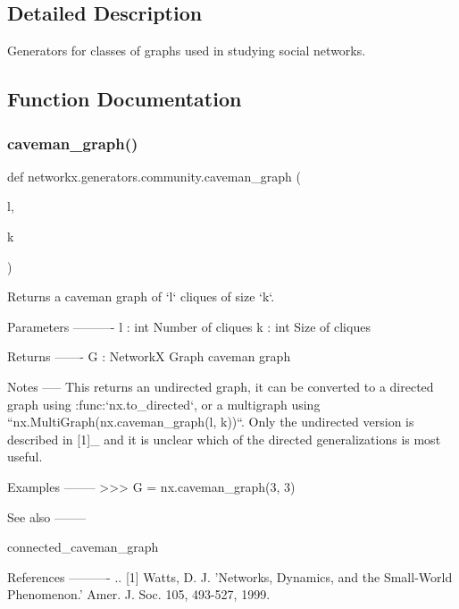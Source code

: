 \subsection{Detailed Description}
\begin{DoxyVerb}Generators for classes of graphs used in studying social networks.\end{DoxyVerb}
 

\subsection{Function Documentation}
\mbox{\label{namespacenetworkx_1_1generators_1_1community_a5a923d44ea3d13312625c65b2e0ff58f}} 
\subsubsection{\texorpdfstring{caveman\+\_\+graph()}{caveman\_graph()}}
{\footnotesize\ttfamily def networkx.\+generators.\+community.\+caveman\+\_\+graph (\begin{DoxyParamCaption}\item[{}]{l,  }\item[{}]{k }\end{DoxyParamCaption})}

\begin{DoxyVerb}Returns a caveman graph of `l` cliques of size `k`.

Parameters
----------
l : int
  Number of cliques
k : int
  Size of cliques

Returns
-------
G : NetworkX Graph
  caveman graph

Notes
-----
This returns an undirected graph, it can be converted to a directed
graph using :func:`nx.to_directed`, or a multigraph using
``nx.MultiGraph(nx.caveman_graph(l, k))``. Only the undirected version is
described in [1]_ and it is unclear which of the directed
generalizations is most useful.

Examples
--------
>>> G = nx.caveman_graph(3, 3)

See also
--------

connected_caveman_graph

References
----------
.. [1] Watts, D. J. 'Networks, Dynamics, and the Small-World Phenomenon.'
   Amer. J. Soc. 105, 493-527, 1999.
\end{DoxyVerb}
 \mbox{\label{namespacenetworkx_1_1generators_1_1community_a28d88705711d5144ae535c533a957a0d}} 

